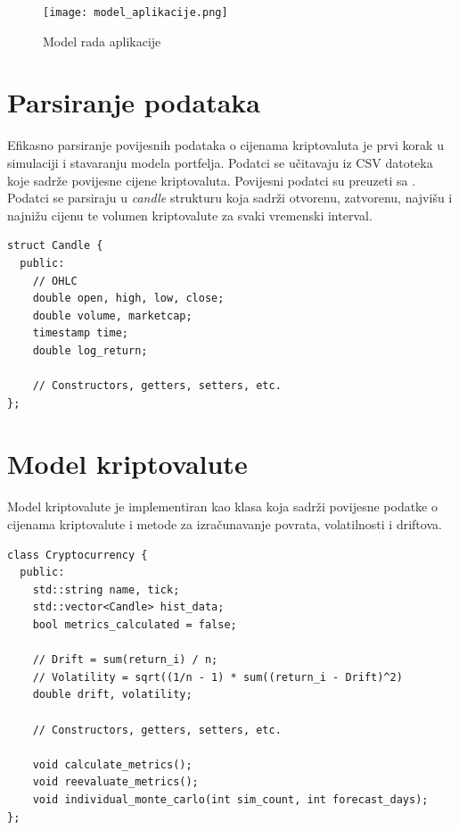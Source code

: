 \documentclass[zavrsnirad]{fer}
\begin{document}
\begin{figure}[ht]
    \centering
    \texttt{[image: model\_aplikacije.png]}
    \caption{Model rada aplikacije}
    \label{fig:model_aplikacije}
\end{figure}

\section{Parsiranje podataka}
\label{sek:parsiranje_podataka}
Efikasno parsiranje povijesnih podataka o cijenama kriptovaluta
je prvi korak u simulaciji i stavaranju modela portfelja.
Podatci se učitavaju iz CSV datoteka koje sadrže povijesne cijene
kriptovaluta. Povijesni podatci su preuzeti sa \cite{1}.
Podatci se parsiraju u \emph{candle} strukturu koja sadrži
otvorenu, zatvorenu, najvišu i najnižu cijenu te volumen
kriptovalute za svaki vremenski interval.
\begin{lstlisting}
struct Candle {
  public:
    // OHLC
    double open, high, low, close;
    double volume, marketcap;
    timestamp time;
    double log_return;

    // Constructors, getters, setters, etc.
};
\end{lstlisting}

\section{Model kriptovalute}
\label{sek:model_kriptovalute}
Model kriptovalute je implementiran kao klasa koja
sadrži povijesne podatke o cijenama kriptovalute
i metode za izračunavanje povrata, volatilnosti
i driftova.
\begin{lstlisting}
class Cryptocurrency {
  public:
    std::string name, tick;
    std::vector<Candle> hist_data;
    bool metrics_calculated = false;

    // Drift = sum(return_i) / n;
    // Volatility = sqrt((1/n - 1) * sum((return_i - Drift)^2)
    double drift, volatility;

    // Constructors, getters, setters, etc.

    void calculate_metrics();
    void reevaluate_metrics();
    void individual_monte_carlo(int sim_count, int forecast_days);
};
\end{lstlisting}
\end{document}
